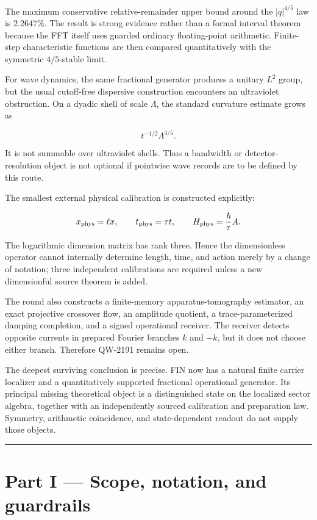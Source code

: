 \documentclass[11pt,a4paper,openany]{report}
\begin{document}
The maximum conservative relative-remainder upper bound around the \(|q|^{4/5}\) law is \(2.2647\%\). The result is strong evidence rather than a formal interval theorem because the FFT itself uses guarded ordinary floating-point arithmetic. Finite-step characteristic functions are then compared quantitatively with the symmetric \(4/5\)-stable limit.

For wave dynamics, the same fractional generator produces a unitary \(L^2\) group, but the usual cutoff-free dispersive construction encounters an ultraviolet obstruction. On a dyadic shell of scale \(\Lambda\), the standard curvature estimate grows as

\[
t^{-1/2}\Lambda^{3/5}.
\]

It is not summable over ultraviolet shells. Thus a bandwidth or detector-resolution object is not optional if pointwise wave records are to be defined by this route.

The smallest external physical calibration is constructed explicitly:

\[
x_{\rm phys}=\ell x,\qquad
t_{\rm phys}=\tau t,\qquad
H_{\rm phys}=\frac{\hbar}{\tau}A.
\]

The logarithmic dimension matrix has rank three. Hence the dimensionless operator cannot internally determine length, time, and action merely by a change of notation; three independent calibrations are required unless a new dimensionful source theorem is added.

The round also constructs a finite-memory apparatus-tomography estimator, an exact projective crossover flow, an amplitude quotient, a trace-parameterized damping completion, and a signed operational receiver. The receiver detects opposite currents in prepared Fourier branches \(k\) and \(-k\), but it does not choose either branch. Therefore QW-2191 remains open.

The deepest surviving conclusion is precise. FIN now has a natural finite carrier localizer and a quantitatively supported fractional operational generator. Its principal missing theoretical object is a distinguished state on the localized sector algebra, together with an independently sourced calibration and preparation law. Symmetry, arithmetic coincidence, and state-dependent readout do not supply those objects.

\par\medskip\hrule\medskip

\chapter{Part I --- Scope, notation, and guardrails}
\end{document}
